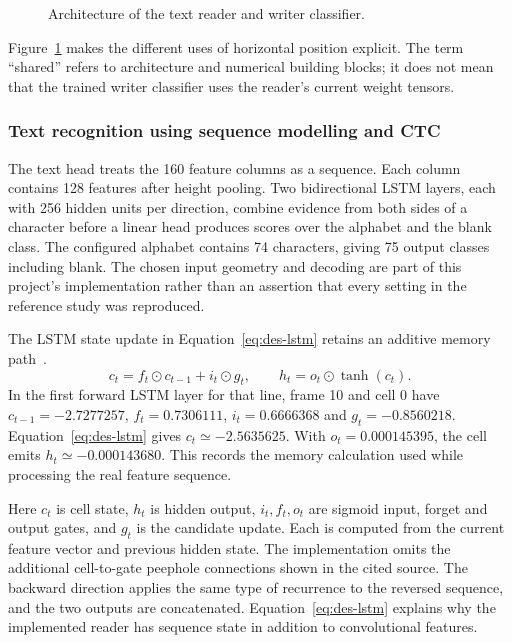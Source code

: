 \begin{figure}[!htbp]\centering
{}
\caption{Architecture of the text reader and writer classifier.}
\label{fig:des-network}
\end{figure}

Figure~\ref{fig:des-network} makes the different uses of horizontal position explicit. The term ``shared'' refers to architecture and numerical building blocks; it does not mean that the trained writer classifier uses the reader's current weight tensors.


\subsubsection{Text recognition using sequence modelling and CTC}
The text head treats the 160 feature columns as a sequence. Each column contains 128 features after height pooling. Two bidirectional LSTM layers, each with 256 hidden units per direction, combine evidence from both sides of a character before a linear head produces scores over the alphabet and the blank class. The configured alphabet contains 74 characters, giving 75 output classes including blank. The chosen input geometry and decoding are part of this project's implementation rather than an assertion that every setting in the reference study was reproduced.


The LSTM state update in Equation~\ref{eq:des-lstm} retains an additive memory path~\cite[p.~5, Eqs.~(9)--(11)]{graves2013}.
\begin{equation}
c_t=f_t\odot c_{t-1}+i_t\odot g_t,\qquad
h_t=o_t\odot\tanh(c_t).
\label{eq:des-lstm}
\end{equation}
In the first forward LSTM layer for that line, frame 10 and cell 0 have $c_{t-1}=-2.7277257$, $f_t=0.7306111$, $i_t=0.6666368$ and $g_t=-0.8560218$. Equation~\ref{eq:des-lstm} gives $c_t\simeq-2.5635625$. With $o_t=0.000145395$, the cell emits $h_t\simeq-0.000143680$. This records the memory calculation used while processing the real feature sequence.

Here $c_t$ is cell state, $h_t$ is hidden output, $i_t,f_t,o_t$ are sigmoid input, forget and output gates, and $g_t$ is the candidate update. Each is computed from the current feature vector and previous hidden state. The implementation omits the additional cell-to-gate peephole connections shown in the cited source. The backward direction applies the same type of recurrence to the reversed sequence, and the two outputs are concatenated. Equation~\ref{eq:des-lstm} explains why the implemented reader has sequence state in addition to convolutional features.

